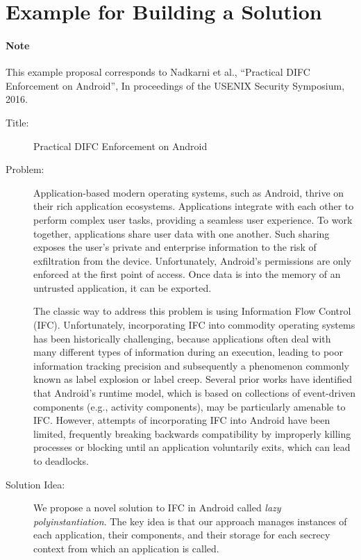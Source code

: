 \documentclass[10pt,pdftex]{article}
\begin{document}
\newpage

\section{Example for Building a Solution}

\paragraph{Note}
This example proposal corresponds to Nadkarni et al., ``Practical DIFC Enforcement on Android'', In proceedings of the USENIX Security Symposium, 2016.

\begin{description}

  \item[Title:] Practical DIFC Enforcement on Android

  \item[Problem:]
    Application-based modern operating systems, such as Android, thrive on their rich application ecosystems. 
    Applications integrate with each other to perform complex user tasks, providing a seamless user experience. 
    To work together, applications share user data with one another. 
    Such sharing exposes the user’s private and enterprise information to the risk of exfiltration from the device.
    Unfortunately, Android's permissions are only enforced at the first point of access. 
    Once data is into the memory of an untrusted application, it can be exported.

    The classic way to address this problem is using Information Flow Control (IFC).
    Unfortunately, incorporating IFC into commodity operating systems has been historically challenging, because applications often deal with many different types of information during an execution, leading to poor information tracking precision and subsequently a phenomenon commonly known as label explosion or label creep.
    Several prior works have identified that Android's runtime model, which is based on collections of event-driven components (e.g., activity components), may be particularly amenable to IFC.
    However, attempts of incorporating IFC into Android have been limited, frequently breaking backwards compatibility by improperly killing processes or blocking until an application voluntarily exits, which can lead to deadlocks.

  \item[Solution Idea:]
    We propose a novel solution to IFC in Android called \emph{lazy polyinstantiation}.
    The key idea is that our approach manages instances of each application, their components, and their storage for each secrecy context from which an application is called.


\end{description}
\end{document}
